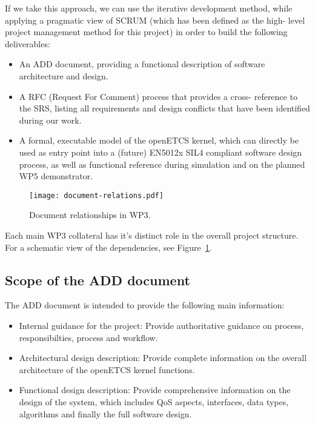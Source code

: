 If we take this approach, we can use the iterative development method, while applying a pragmatic view of SCRUM (which has been defined as the high- level project management method for this project) in order to build the following deliverables:

\begin{itemize}
\item An ADD document, providing a functional description of software architecture and design.
 
\item A RFC (Request For Comment) process that provides a cross- reference to the SRS, listing all requirements and design conflicts that have been identified during our work.
 
\item A formal, executable model of the openETCS kernel, which can directly be used as entry point into a (future) EN5012x SIL4 compliant software design process, as well as functional reference during simulation and on the planned WP5 demonstrator.
\end{itemize}
 
\begin{figure}
\centering
\texttt{[image: document-relations.pdf]}
\caption{Document relationships in WP3.}
\label{fig:doc-rels}
\end{figure}

Each main WP3 collateral has it's distinct role in the overall project structure. For a schematic view of the dependencies, see Figure~\ref{fig:doc-rels}.


\subsection{Scope of the ADD document}
 
The ADD document is intended to provide the following main information:

\begin{itemize}
\item Internal guidance for the project: Provide authoritative guidance on process, responsibilties, process and workflow.
 
\item Architectural design description: Provide complete information on the overall architecture of the openETCS kernel functions.

\item Functional design description: Provide comprehensive information on the design of the system, which includes QoS aspects, interfaces, data types, algorithms and finally the full software design.
\end{itemize}

